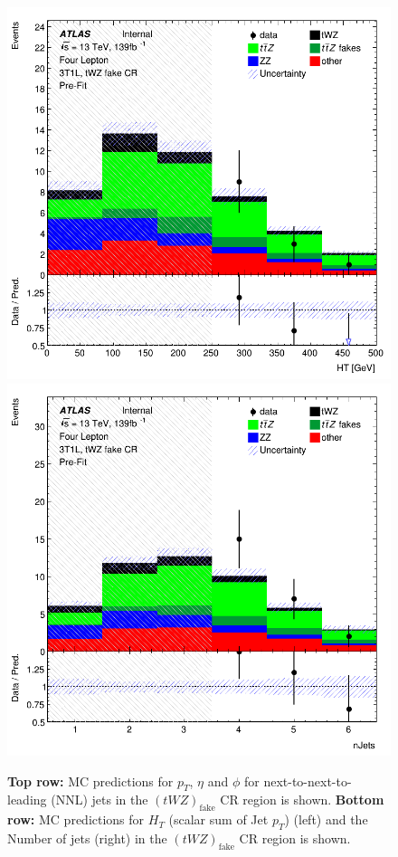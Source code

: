 \begin{figure}[htbp]
    \includegraphics[width=.3\textwidth]{figures/PreFitPlots/lep4_tWZ_3T1L_HT.png}   \quad
    \includegraphics[width=.3\textwidth]{figures/PreFitPlots/lep4_tWZ_3T1L_Num_Jets.png}

    \caption{\textbf{Top row:} MC predictions for $p_{T}$, $\eta$ and $\phi$ for next-to-next-to-leading (NNL) jets in the $(tWZ)_{\text{fake}}$ CR region  is shown. \textbf{Bottom row:} MC predictions for $H_{T}$ (scalar sum of Jet $p_{T}$) (left) and the Number of jets (right) in the $(tWZ)_{\text{fake}}$ CR region  is shown.}
    \label{fig:4lep-tWZ-fake-CR-NNLjetPlots} 
\end{figure}



